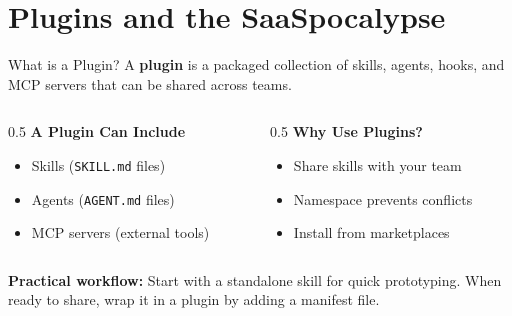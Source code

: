 \documentclass[aspectratio=169]{beamer}
\begin{document}
\section{Plugins and the SaaSpocalypse}

\begin{frame}{What is a Plugin?}
A \textbf{plugin} is a packaged collection of skills, agents, hooks, and MCP servers that can be shared across teams.
\vspace{0.3cm}
\begin{columns}[T]
\begin{column}{0.5\textwidth}
\textbf{A Plugin Can Include}
\begin{itemize}\small
  \item Skills (\texttt{SKILL.md} files)
  \item Agents (\texttt{AGENT.md} files)
  \item MCP servers (external tools)
\end{itemize}
\end{column}
\begin{column}{0.5\textwidth}
\textbf{Why Use Plugins?}
\begin{itemize}\small
  \item Share skills with your team
  \item Namespace prevents conflicts
  \item Install from marketplaces
\end{itemize}
\end{column}
\end{columns}
\vspace{0.3cm}
\textbf{Practical workflow:} Start with a standalone skill for quick prototyping. When ready to share, wrap it in a plugin by adding a manifest file.
\end{frame}
\end{document}
